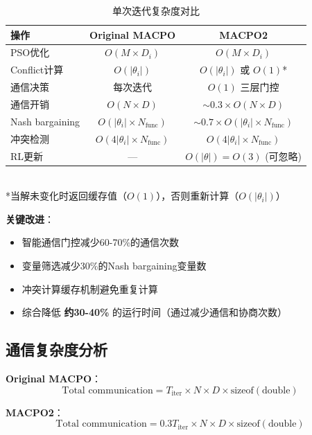 \documentclass[15pt,a3paper]{ctexart}
\begin{document}
\begin{table}[h]
\centering
\caption{单次迭代复杂度对比}
\begin{tabular}{|l|c|c|}
\hline
\textbf{操作} & \textbf{Original MACPO} & \textbf{MACPO2} \\
\hline
PSO优化 & $O(M \times D_i)$ & $O(M \times D_i)$ \\
\hline
Conflict计算 & $O(|\theta_i|)$ & $O(|\theta_i|)$ 或 $O(1)$* \\
\hline
通信决策 & 每次迭代 & $O(1)$ 三层门控 \\
\hline
通信开销 & $O(N \times D)$ & $\sim 0.3 \times O(N \times D)$ \\
\hline
Nash bargaining & $O(|\theta_i| \times N_{\text{func}})$ & $\sim 0.7 \times O(|\theta_i| \times N_{\text{func}})$ \\
\hline
冲突检测 & $O(4|\theta_i| \times N_{\text{func}})$ & $O(4|\theta_i| \times N_{\text{func}})$ \\
\hline
RL更新 & --- & $O(|\theta|) = O(3)$ (可忽略) \\
\hline
\end{tabular}
\\[0.3cm]
*当解未变化时返回缓存值（$O(1)$），否则重新计算（$O(|\theta_i|)$）
\end{table}

\textbf{关键改进}：
\begin{itemize}
    \item 智能通信门控减少60-70\%的通信次数
    \item 变量筛选减少30\%的Nash bargaining变量数
    \item 冲突计算缓存机制避免重复计算
    \item 综合降低 \textbf{约30-40\%} 的运行时间（通过减少通信和协商次数）
\end{itemize}

\subsection{通信复杂度分析}

\textbf{Original MACPO}：
\begin{equation}
\text{Total communication} = T_{\text{iter}} \times N \times D \times \text{sizeof}(\text{double})
\end{equation}

\textbf{MACPO2}：
\begin{equation}
\text{Total communication} = 0.3 T_{\text{iter}} \times N \times D \times \text{sizeof}(\text{double})
\end{equation}
\end{document}

